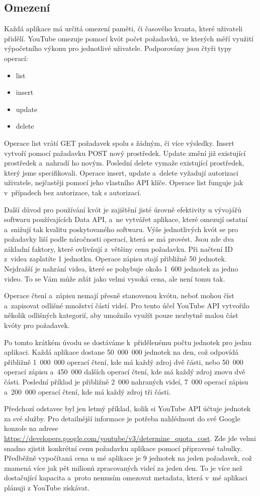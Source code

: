\subsection{Omezení}
\par Každá aplikace má určitá omezení\cite{googleconsole} paměti\cite{quota}, či časového kvanta, které uživateli přidělí. YouTube omezuje pomocí kvót počet požadavků, ve kterých měří využití výpočetního výkonu pro jednotlivé uživatele. Podporovány jsou čtyři typy operací:
\begin{itemize}
\item {list}
\item {insert}
\item {update}
\item {delete}
\end{itemize}
\par Operace list vrátí GET požadavek spolu s žádným, či více výsledky. Insert vytvoří pomocí pažadavku POST nový prostředek. Update změní již existující prostředek a~nahradí ho novým. Poslední delete vymaže existující prostředek, který jsme specifikovali. Operace insert, update a~delete vyžadují autorizaci uživatele, nejčastěji pomocí jeho vlastního API\cite{apistart} klíče. Operace list funguje jak v~případech bez autorizace, tak s autorizací.
\par Další důvod pro používání kvót je zajištění jisté úrovně efektivity u vývojářů softwaru používajících Data API, a~ne vytvářet aplikace, které omezují ostatní a~snižují tak kvalitu poskytovaného softwaru. Výše jednotlivých kvót se pro požadavky liší podle náročnosti operací, která se má provést. Jsou zde dva základní faktory, které ovlivňují z~většiny cenu požadavku. Při načtení ID z~videa zaplatíte 1 jednotku. Operace zápisu stojí přibližně 50 jednotek. Nejdražší je nahrání videa, které se pohybuje okolo 1~600 jednotek za jedno video. To se Vám může zdát jako velmi vysoká cena, ale není tomu tak. 
\par Operace čtení a~zápisu nemají přesně stanovenou kvótu, neboť mohou číst a~zapisovat odlišné množství částí videí. Pro tento účel YouTube API vytvořilo několik odlišných kategorií, aby umožnilo využít pouze nezbytně malou část kvóty pro požadavek. 
\par Po tomto krátkém úvodu se dostáváme k~přidělenému počtu jednotek pro jednu aplikaci. Každá aplikace dostane 50~000~000 jednotek na den, což odpovídá přibližně 1~000~000 operací čtení, kde má každý zdroj dvě části, nebo 50~000 operací zápisu a~450~000 dalších operací čtení, kde má každý zdroj znovu dvě části. Poslední příklad je přibližně 2~000 nahraných videí, 7~000 operací zápisu a~200~000 operací čtení, kde má každý zdroj tři části.
\par Předchozí odstavec byl jen letmý příklad, kolik si YouTube API účtuje jednotek za své služby. Pro detailnější informace je potřeba nahlédnout do své Google konzole na adrese \url{https://developers.google.com/youtube/v3/determine_quota_cost}\cite{quota}. Zde jde velmi snadno zjistit konkrétní cenu požadavku aplikace pomocí připravené tabulky. Předběžně vypočítaná cena u mé aplikace je 9 jednotek na jeden požadavek, což znamená více jak pět milionů zpracovaných videí za jeden den. To je více než dostačující kapacita a~proto nemusím omezovat metadata, která v~mé aplikaci plánuji z YouTube získávat. 